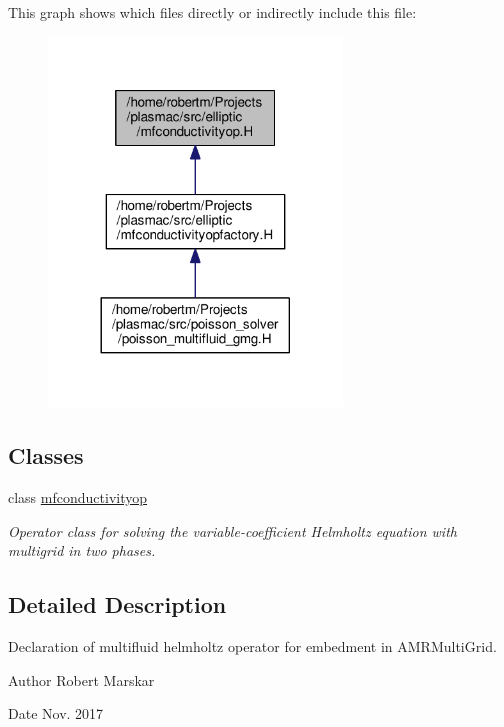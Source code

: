 This graph shows which files directly or indirectly include this file\+:\nopagebreak
\begin{figure}[H]
\begin{center}
\leavevmode
\includegraphics[width=221pt]{mfconductivityop_8H__dep__incl}
\end{center}
\end{figure}
\subsection*{Classes}
\begin{DoxyCompactItemize}
\item 
class \hyperlink{classmfconductivityop}{mfconductivityop}
\begin{DoxyCompactList}\small\item\em Operator class for solving the variable-\/coefficient Helmholtz equation with multigrid in two phases. \end{DoxyCompactList}\end{DoxyCompactItemize}


\subsection{Detailed Description}
Declaration of multifluid helmholtz operator for embedment in A\+M\+R\+Multi\+Grid. 

\begin{DoxyAuthor}{Author}
Robert Marskar 
\end{DoxyAuthor}
\begin{DoxyDate}{Date}
Nov. 2017 
\end{DoxyDate}
